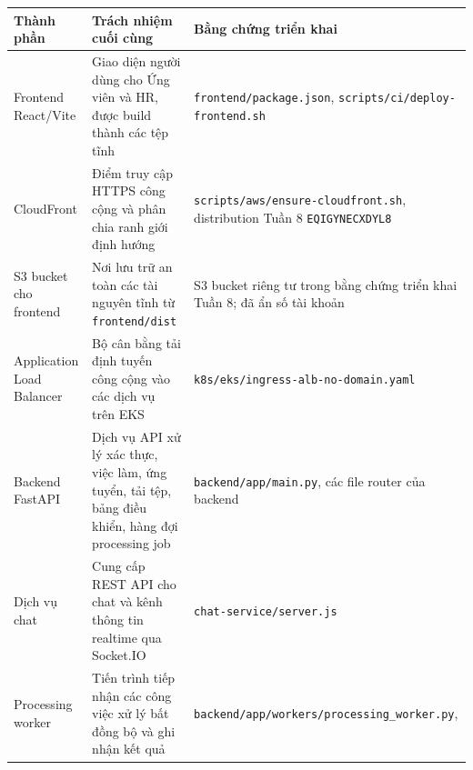 {
\begingroup
\small
\setlength{\tabcolsep}{3pt}
\renewcommand{\arraystretch}{1.15}
\begin{longtable}{@{}
  >{\raggedright\arraybackslash}p{}
  >{\raggedright\arraybackslash}p{}
  >{\raggedright\arraybackslash}p{}@{}}
\toprule\noalign{}
\begin{minipage}[b]{\linewidth}\raggedright
Thành phần
\end{minipage} & \begin{minipage}[b]{\linewidth}\raggedright
Trách nhiệm cuối cùng
\end{minipage} & \begin{minipage}[b]{\linewidth}\raggedright
Bằng chứng triển khai
\end{minipage} \\
\midrule\noalign{}
\endhead
\bottomrule\noalign{}
\endlastfoot
Frontend React/Vite & Giao diện người dùng cho Ứng viên và HR, được
build thành các tệp tĩnh & \texttt{frontend/\allowbreak{}package.\allowbreak{}json},
\texttt{scripts/\allowbreak{}ci/\allowbreak{}deploy-\allowbreak{}frontend.\allowbreak{}sh} \\
CloudFront & Điểm truy cập HTTPS công cộng và phân chia ranh giới định
hướng & \texttt{scripts/\allowbreak{}aws/\allowbreak{}ensure-\allowbreak{}cloudfront.\allowbreak{}sh}, distribution Tuần 8
\texttt{EQIGYNECXDYL8} \\
S3 bucket cho frontend & Nơi lưu trữ an toàn các tài nguyên tĩnh từ
\texttt{frontend/\allowbreak{}dist} & S3 bucket riêng tư trong bằng chứng triển khai
Tuần 8; đã ẩn số tài khoản \\
Application Load Balancer & Bộ cân bằng tải định tuyến công cộng vào các
dịch vụ trên EKS & \texttt{k8s/\allowbreak{}eks/\allowbreak{}ingress-\allowbreak{}alb-\allowbreak{}no-\allowbreak{}domain.\allowbreak{}yaml} \\
Backend FastAPI & Dịch vụ API xử lý xác thực, việc làm, ứng tuyển, tải
tệp, bảng điều khiển, hàng đợi processing job &
\texttt{backend/\allowbreak{}app/\allowbreak{}main.\allowbreak{}py}, các file router của backend \\
Dịch vụ chat & Cung cấp REST API cho chat và kênh thông tin realtime qua
Socket.IO & \texttt{chat-\allowbreak{}service/\allowbreak{}server.\allowbreak{}js} \\
Processing worker & Tiến trình tiếp nhận các công việc xử lý bất đồng bộ
và ghi nhận kết quả &
\texttt{backend/\allowbreak{}app/\allowbreak{}workers/\allowbreak{}processing\_\allowbreak{}worker.\allowbreak{}py},

\end{longtable}}
